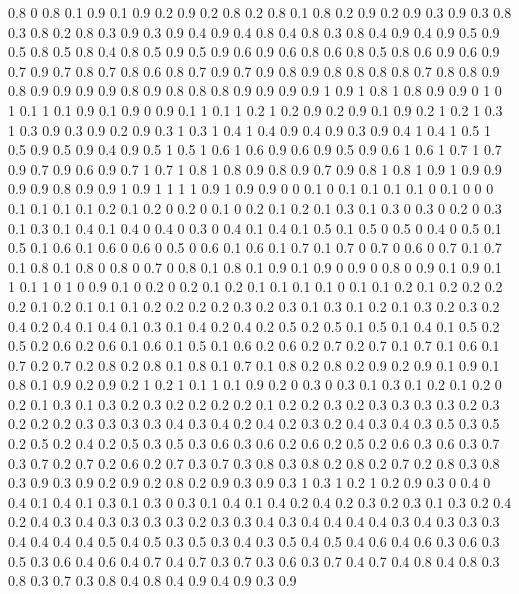 0.8 0
0.8 0.1
0.9 0.1
0.9 0.2
0.9 0.2
0.8 0.2
0.8 0.1
0.8 0.2
0.9 0.2
0.9 0.3
0.9 0.3
0.8 0.3
0.8 0.2
0.8 0.3
0.9 0.3
0.9 0.4
0.9 0.4
0.8 0.4
0.8 0.3
0.8 0.4
0.9 0.4
0.9 0.5
0.9 0.5
0.8 0.5
0.8 0.4
0.8 0.5
0.9 0.5
0.9 0.6
0.9 0.6
0.8 0.6
0.8 0.5
0.8 0.6
0.9 0.6
0.9 0.7
0.9 0.7
0.8 0.7
0.8 0.6
0.8 0.7
0.9 0.7
0.9 0.8
0.9 0.8
0.8 0.8
0.8 0.7
0.8 0.8
0.9 0.8
0.9 0.9
0.9 0.9
0.8 0.9
0.8 0.8
0.8 0.9
0.9 0.9
0.9 1
0.9 1
0.8 1
0.8 0.9
0.9 0
1 0
1 0.1
1 0.1
0.9 0.1
0.9 0
0.9 0.1
1 0.1
1 0.2
1 0.2
0.9 0.2
0.9 0.1
0.9 0.2
1 0.2
1 0.3
1 0.3
0.9 0.3
0.9 0.2
0.9 0.3
1 0.3
1 0.4
1 0.4
0.9 0.4
0.9 0.3
0.9 0.4
1 0.4
1 0.5
1 0.5
0.9 0.5
0.9 0.4
0.9 0.5
1 0.5
1 0.6
1 0.6
0.9 0.6
0.9 0.5
0.9 0.6
1 0.6
1 0.7
1 0.7
0.9 0.7
0.9 0.6
0.9 0.7
1 0.7
1 0.8
1 0.8
0.9 0.8
0.9 0.7
0.9 0.8
1 0.8
1 0.9
1 0.9
0.9 0.9
0.9 0.8
0.9 0.9
1 0.9
1 1
1 1
0.9 1
0.9 0.9
0 0
0.1 0
0.1 0.1
0.1 0.1
0 0.1
0 0
0 0.1
0.1 0.1
0.1 0.2
0.1 0.2
0 0.2
0 0.1
0 0.2
0.1 0.2
0.1 0.3
0.1 0.3
0 0.3
0 0.2
0 0.3
0.1 0.3
0.1 0.4
0.1 0.4
0 0.4
0 0.3
0 0.4
0.1 0.4
0.1 0.5
0.1 0.5
0 0.5
0 0.4
0 0.5
0.1 0.5
0.1 0.6
0.1 0.6
0 0.6
0 0.5
0 0.6
0.1 0.6
0.1 0.7
0.1 0.7
0 0.7
0 0.6
0 0.7
0.1 0.7
0.1 0.8
0.1 0.8
0 0.8
0 0.7
0 0.8
0.1 0.8
0.1 0.9
0.1 0.9
0 0.9
0 0.8
0 0.9
0.1 0.9
0.1 1
0.1 1
0 1
0 0.9
0.1 0
0.2 0
0.2 0.1
0.2 0.1
0.1 0.1
0.1 0
0.1 0.1
0.2 0.1
0.2 0.2
0.2 0.2
0.1 0.2
0.1 0.1
0.1 0.2
0.2 0.2
0.2 0.3
0.2 0.3
0.1 0.3
0.1 0.2
0.1 0.3
0.2 0.3
0.2 0.4
0.2 0.4
0.1 0.4
0.1 0.3
0.1 0.4
0.2 0.4
0.2 0.5
0.2 0.5
0.1 0.5
0.1 0.4
0.1 0.5
0.2 0.5
0.2 0.6
0.2 0.6
0.1 0.6
0.1 0.5
0.1 0.6
0.2 0.6
0.2 0.7
0.2 0.7
0.1 0.7
0.1 0.6
0.1 0.7
0.2 0.7
0.2 0.8
0.2 0.8
0.1 0.8
0.1 0.7
0.1 0.8
0.2 0.8
0.2 0.9
0.2 0.9
0.1 0.9
0.1 0.8
0.1 0.9
0.2 0.9
0.2 1
0.2 1
0.1 1
0.1 0.9
0.2 0
0.3 0
0.3 0.1
0.3 0.1
0.2 0.1
0.2 0
0.2 0.1
0.3 0.1
0.3 0.2
0.3 0.2
0.2 0.2
0.2 0.1
0.2 0.2
0.3 0.2
0.3 0.3
0.3 0.3
0.2 0.3
0.2 0.2
0.2 0.3
0.3 0.3
0.3 0.4
0.3 0.4
0.2 0.4
0.2 0.3
0.2 0.4
0.3 0.4
0.3 0.5
0.3 0.5
0.2 0.5
0.2 0.4
0.2 0.5
0.3 0.5
0.3 0.6
0.3 0.6
0.2 0.6
0.2 0.5
0.2 0.6
0.3 0.6
0.3 0.7
0.3 0.7
0.2 0.7
0.2 0.6
0.2 0.7
0.3 0.7
0.3 0.8
0.3 0.8
0.2 0.8
0.2 0.7
0.2 0.8
0.3 0.8
0.3 0.9
0.3 0.9
0.2 0.9
0.2 0.8
0.2 0.9
0.3 0.9
0.3 1
0.3 1
0.2 1
0.2 0.9
0.3 0
0.4 0
0.4 0.1
0.4 0.1
0.3 0.1
0.3 0
0.3 0.1
0.4 0.1
0.4 0.2
0.4 0.2
0.3 0.2
0.3 0.1
0.3 0.2
0.4 0.2
0.4 0.3
0.4 0.3
0.3 0.3
0.3 0.2
0.3 0.3
0.4 0.3
0.4 0.4
0.4 0.4
0.3 0.4
0.3 0.3
0.3 0.4
0.4 0.4
0.4 0.5
0.4 0.5
0.3 0.5
0.3 0.4
0.3 0.5
0.4 0.5
0.4 0.6
0.4 0.6
0.3 0.6
0.3 0.5
0.3 0.6
0.4 0.6
0.4 0.7
0.4 0.7
0.3 0.7
0.3 0.6
0.3 0.7
0.4 0.7
0.4 0.8
0.4 0.8
0.3 0.8
0.3 0.7
0.3 0.8
0.4 0.8
0.4 0.9
0.4 0.9
0.3 0.9
